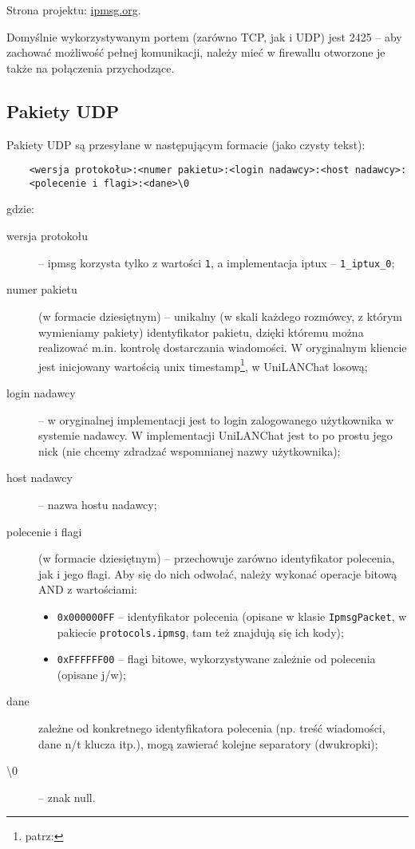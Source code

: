 \documentclass[11pt,leqno]{article}
\begin{document}
Strona projektu: \href{http://ipmsg.org}{ipmsg.org}.

Domyślnie wykorzystywanym portem (zarówno TCP, jak i UDP) jest 2425 -- aby zachować możliwość
pełnej komunikacji, należy mieć w firewallu otworzone je także na połączenia przychodzące.

\subsection{Pakiety UDP}\label{sec:udpPackets}

Pakiety UDP są przesyłane w następującym formacie (jako czysty tekst):
\begin{verbatim}
	<wersja protokołu>:<numer pakietu>:<login nadawcy>:<host nadawcy>:
	<polecenie i flagi>:<dane>\0
\end{verbatim}
gdzie:
\begin{description}
	\item[wersja protokołu] -- ipmsg korzysta tylko z wartości \texttt{1}, a implementacja
	iptux -- \texttt{1\_iptux\_0};
	\item[numer pakietu] (w formacie dziesiętnym) -- unikalny (w skali każdego rozmówcy, z którym
	wymieniamy pakiety) identyfikator pakietu, dzięki któremu można realizować m.in. kontrolę
	dostarczania wiadomości. W oryginalnym kliencie jest inicjowany wartością
	unix timestamp\footnote{patrz: }, w UniLANChat losową;
	\item[login nadawcy] -- w oryginalnej implementacji jest to login zalogowanego
	użytkownika w systemie nadawcy. W implementacji UniLANChat jest to po prostu jego nick (nie
	chcemy zdradzać wspomnianej nazwy użytkownika);
	\item[host nadawcy] -- nazwa hostu nadawcy;
	\item[polecenie i flagi] (w formacie dziesiętnym) -- przechowuje zarówno identyfikator polecenia, jak i jego
	flagi. Aby się do nich odwołać, należy wykonać operacje bitową AND z wartościami:
	\begin{itemize}
		\item \texttt{0x000000FF} -- identyfikator polecenia (opisane w klasie \texttt{IpmsgPacket},
		w pakiecie \texttt{protocols.ipmsg}, tam też znajdują się ich kody);
		\item \texttt{0xFFFFFF00} -- flagi bitowe, wykorzystywane zależnie od polecenia (opisane j/w);
	\end{itemize}
	\item[dane] zależne od konkretnego identyfikatora polecenia (np. treść wiadomości,
	dane n/t klucza itp.), mogą zawierać kolejne separatory (dwukropki);
	\item[\textbackslash0] -- znak null.
\end{description}
\end{document}
